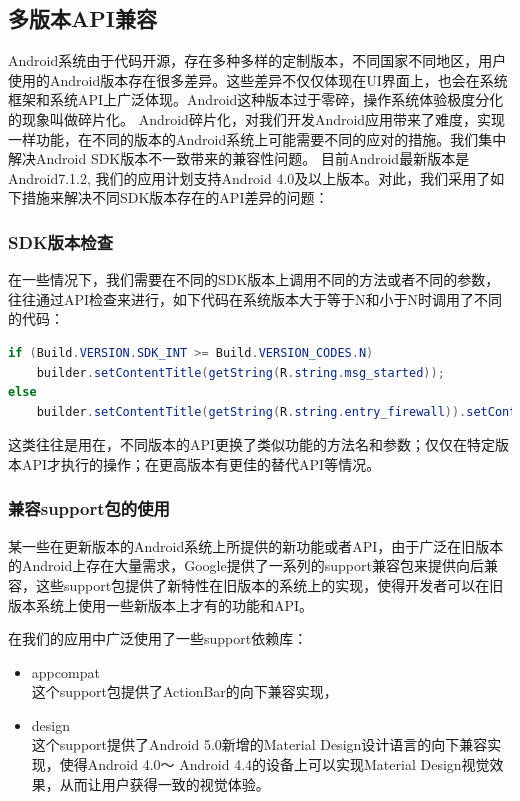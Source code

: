 \documentclass[format=final, language=chinese, degree=fyp]{hustthesis}
\begin{document}
\subsection{多版本API兼容}

Android系统由于代码开源，存在多种多样的定制版本，不同国家不同地区，用户使用的Android版本存在很多差异。这些差异不仅仅体现在UI界面上，也会在系统框架和系统API上广泛体现。Android这种版本过于零碎，操作系统体验极度分化的现象叫做碎片化。
Android碎片化，对我们开发Android应用带来了难度，实现一样功能，在不同的版本的Android系统上可能需要不同的应对的措施。我们集中解决Android SDK版本不一致带来的兼容性问题。
目前Android最新版本是Android7.1.2, 我们的应用计划支持Android 4.0及以上版本。对此，我们采用了如下措施来解决不同SDK版本存在的API差异的问题：

\subsubsection{SDK版本检查}
在一些情况下，我们需要在不同的SDK版本上调用不同的方法或者不同的参数，往往通过API检查来进行，如下代码在系统版本大于等于N和小于N时调用了不同的代码：
 
\begin{lstlisting}[language=java]
if (Build.VERSION.SDK_INT >= Build.VERSION_CODES.N)
  	builder.setContentTitle(getString(R.string.msg_started));
else
    builder.setContentTitle(getString(R.string.entry_firewall)).setContentText(getString(R.string.msg_started));
\end{lstlisting}


这类往往是用在，不同版本的API更换了类似功能的方法名和参数；仅仅在特定版本API才执行的操作；在更高版本有更佳的替代API等情况。

\subsubsection{兼容support包的使用}

某一些在更新版本的Android系统上所提供的新功能或者API，由于广泛在旧版本的Android上存在大量需求，Google提供了一系列的support兼容包来提供向后兼容，这些support包提供了新特性在旧版本的系统上的实现，使得开发者可以在旧版本系统上使用一些新版本上才有的功能和API。

在我们的应用中广泛使用了一些support依赖库：
\begin{itemize}
	\item appcompat \\ 这个support包提供了ActionBar的向下兼容实现，
	\item design\\ 这个support提供了Android 5.0新增的Material Design设计语言的向下兼容实现，使得Android 4.0～ Android 4.4的设备上可以实现Material Design视觉效果，从而让用户获得一致的视觉体验。
\end{itemize}
\end{document}
